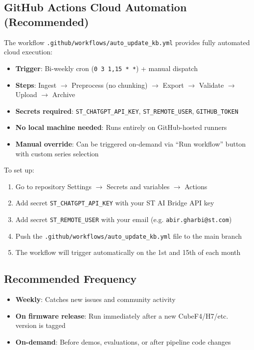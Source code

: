 \documentclass[12pt,a4paper]{report}
\begin{document}
\subsection{GitHub Actions Cloud Automation (Recommended)}

The workflow \texttt{.github/workflows/auto\_update\_kb.yml} provides fully automated cloud execution:

\begin{itemize}
  \item \textbf{Trigger}: Bi-weekly cron (\texttt{0 3 1,15 * *}) + manual dispatch
  \item \textbf{Steps}: Ingest $\to$ Preprocess (no chunking) $\to$ Export $\to$ Validate $\to$ Upload $\to$ Archive
  \item \textbf{Secrets required}: \texttt{ST\_CHATGPT\_API\_KEY}, \texttt{ST\_REMOTE\_USER}, \texttt{GITHUB\_TOKEN}
  \item \textbf{No local machine needed}: Runs entirely on GitHub-hosted runners
  \item \textbf{Manual override}: Can be triggered on-demand via ``Run workflow'' button with custom series selection
\end{itemize}

To set up:
\begin{enumerate}
  \item Go to repository Settings $\to$ Secrets and variables $\to$ Actions
  \item Add secret \texttt{ST\_CHATGPT\_API\_KEY} with your ST AI Bridge API key
  \item Add secret \texttt{ST\_REMOTE\_USER} with your email (e.g. \texttt{abir.gharbi@st.com})
  \item Push the \texttt{.github/workflows/auto\_update\_kb.yml} file to the main branch
  \item The workflow will trigger automatically on the 1st and 15th of each month
\end{enumerate}

\subsection{Recommended Frequency}

\begin{itemize}
  \item \textbf{Weekly}: Catches new issues and community activity
  \item \textbf{On firmware release}: Run immediately after a new CubeF4/H7/etc. version is tagged
  \item \textbf{On-demand}: Before demos, evaluations, or after pipeline code changes
\end{itemize}
\end{document}
